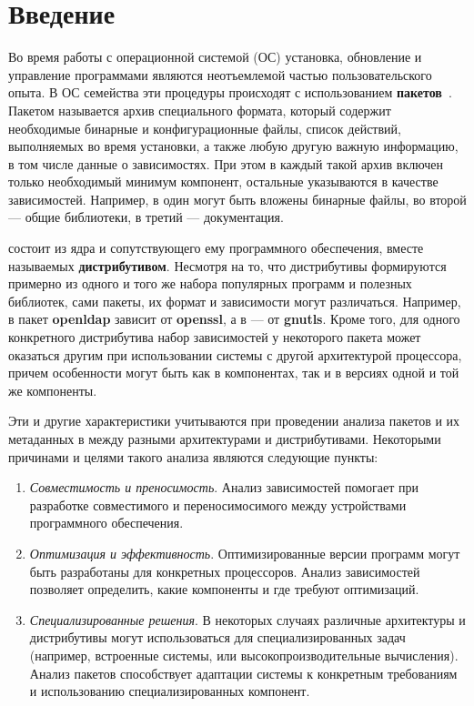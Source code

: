 
\section*{Введение}
\label{sec:intro}

Во время работы с операционной системой (ОС) установка, обновление и управление программами являются неотъемлемой частью пользовательского опыта.
В ОС семейства {\linux} эти процедуры происходят с использованием \textbf{пакетов}~\cite{IntroductionToLinux}.
Пакетом называется архив специального формата, который содержит необходимые бинарные и конфигурационные файлы, список действий, выполняемых во время установки, а также любую другую важную информацию, в том числе данные о зависимостях.
При этом в каждый такой архив включен только необходимый минимум компонент, остальные указываются в качестве зависимостей.
Например, в один могут быть вложены бинарные файлы, во второй --- общие библиотеки, в третий --- документация.

{\linux} состоит из ядра и сопутствующего ему программного обеспечения, вместе называемых \textbf{дистрибутивом}.
Несмотря на то, что дистрибутивы формируются примерно из одного и того же набора популярных программ и полезных библиотек, сами пакеты, их формат и зависимости могут различаться.
Например, в {\centos} пакет \textbf{openldap} зависит от \textbf{openssl}, а в {\ubuntu} --- от \textbf{gnutls}.
Кроме того, для одного конкретного дистрибутива набор зависимостей у некоторого пакета может оказаться другим при использовании системы с другой архитектурой процессора, причем особенности могут быть как в компонентах, так и в версиях одной и той же компоненты.

Эти и другие характеристики учитываются при проведении анализа пакетов и их метаданных в {\linux} между разными архитектурами и дистрибутивами.
Некоторыми причинами и целями такого анализа являются следующие пункты:
\begin{enumerate}
	\item \textit{Совместимость и преносимость}. Анализ зависимостей помогает при разработке совместимого и переносимосимого между устройствами программного обеспечения.
	\item \textit{Оптимизация и эффективность}. Оптимизированные версии программ могут быть разработаны для конкретных процессоров. Анализ зависимостей позволяет определить, какие компоненты и где требуют оптимизаций.
	\item \textit{Специализированные решения}. В некоторых случаях различные архитектуры и дистрибутивы могут использоваться для специализированных задач (например, встроенные системы, или высокопроизводительные вычисления). Анализ пакетов способствует адаптации системы к конкретным требованиям и использованию специализированных компонент.
\end{enumerate}

